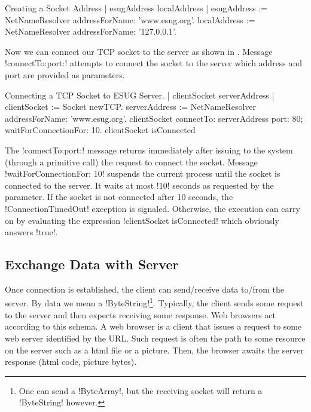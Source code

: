 \documentclass[a4paper,10pt,twoside]{book}
\begin{document}

\begin{script}[creatingSocketAddress]{Creating a Socket Address}
| esugAddress localAddress |
esugAddress := NetNameResolver addressForName: 'www.esug.org'.
localAddress := NetNameResolver addressForName: '127.0.0.1'.
\end{script}

Now we can connect our TCP socket to the server as shown in .
Message \ct!connectTo:port:! attempts to connect the socket to the server which address and port are provided as parameters.

\begin{script}[connectingTcpSocket]{Connecting a TCP Socket to ESUG Server.}
| clientSocket serverAddress |
clientSocket := Socket newTCP.
serverAddress := NetNameResolver addressForName: 'www.esug.org'.
clientSocket 
	connectTo: serverAddress port: 80;
	waitForConnectionFor: 10.
clientSocket isConnected
\end{script}

The \ct!connectTo:port:!  message returns immediately after issuing to the system (through a primitive call) the request to connect the socket.
Message \ct!waitForConnectionFor: 10! suspends the current process until the socket is connected to the server.
It waits at most \ct!10! seconds as requested by the parameter.
If the socket is not connected after 10 seconds, the \ct!ConnectionTimedOut! exception is signaled. 
Otherwise, the execution can carry on by evaluating the expression \ct!clientSocket isConnected! which obviously answers \ct!true!.



\subsection{Exchange Data with Server}
\label{sec:exchangeData}
Once connection is established, the client can send/receive data to/from the server.
By data we mean a \ct!ByteString!\footnote{One can send a \ct!ByteArray!, but the receiving socket will return a \ct!ByteString! however.}.
Typically, the client sends some request to the server and then expects receiving some response.
Web browsers act according to this schema.
A web browser is a client that issues a request to some web server identified by the URL.
Such request is often the path to some resource on the server such as a html file or a picture.
Then, the browser awaits the server response (\eg html code, picture bytes).
\end{document}
